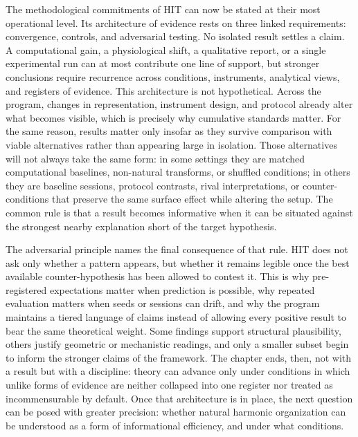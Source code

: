 The methodological commitments of HIT can now be stated at their most operational level. Its architecture of evidence rests on three linked requirements: convergence, controls, and adversarial testing. No isolated result settles a claim. A computational gain, a physiological shift, a qualitative report, or a single experimental run can at most contribute one line of support, but stronger conclusions require recurrence across conditions, instruments, analytical views, and registers of evidence. This architecture is not hypothetical. Across the program, changes in representation, instrument design, and protocol already alter what becomes visible, which is precisely why cumulative standards matter. For the same reason, results matter only insofar as they survive comparison with viable alternatives rather than appearing large in isolation. Those alternatives will not always take the same form: in some settings they are matched computational baselines, non-natural transforms, or shuffled conditions; in others they are baseline sessions, protocol contrasts, rival interpretations, or counter-conditions that preserve the same surface effect while altering the setup. The common rule is that a result becomes informative when it can be situated against the strongest nearby explanation short of the target hypothesis.

The adversarial principle names the final consequence of that rule. HIT does not ask only whether a pattern appears, but whether it remains legible once the best available counter-hypothesis has been allowed to contest it. This is why pre-registered expectations matter when prediction is possible, why repeated evaluation matters when seeds or sessions can drift, and why the program maintains a tiered language of claims instead of allowing every positive result to bear the same theoretical weight. Some findings support structural plausibility, others justify geometric or mechanistic readings, and only a smaller subset begin to inform the stronger claims of the framework. The chapter ends, then, not with a result but with a discipline: theory can advance only under conditions in which unlike forms of evidence are neither collapsed into one register nor treated as incommensurable by default. Once that architecture is in place, the next question can be posed with greater precision: whether natural harmonic organization can be understood as a form of informational efficiency, and under what conditions.
